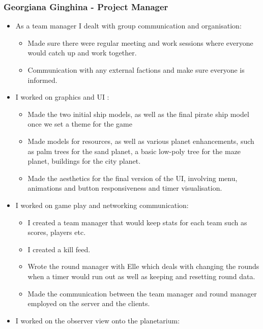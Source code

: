 \documentclass[11pt,a4paper]{article}
\begin{document}
        \subsubsection{Georgiana Ginghina - Project Manager }
        \begin{itemize}
          \item As a team manager I dealt with group communication and organisation:
          \begin{itemize}
            \item Made sure there were regular meeting and work sessions where everyone would catch up and work together.
            \item Communication with any external factions and make sure everyone is informed.
          \end{itemize}
          \item I worked on graphics and UI :
          \begin{itemize}
            \item Made the two initial ship models, as well as the final pirate ship model once we set a theme for the game
            \item Made models for resources, as well as various planet enhancements, such as palm trees for the sand planet, a basic low-poly tree for the maze planet, buildings for the city planet.
            \item Made the aesthetics for the final version of the UI, involving menu, animations and button responsiveness and timer visualisation. 
          \end{itemize}
          \item I worked on game play and networking communication:
          \begin{itemize}
            \item I created a team manager that would keep stats for each team such as scores, players etc.
            \item I created a kill feed.
            \item Wrote the round manager with Elle which deals with changing the rounds when a timer would run out as well as keeping and resetting round data.
            \item Made the communication between the team manager and round manager employed on the server and the clients.
          \end{itemize}
          \item I worked on the observer view onto the planetarium:
          \begin{itemize}

\end{itemize}
\end{itemize}
\end{document}
